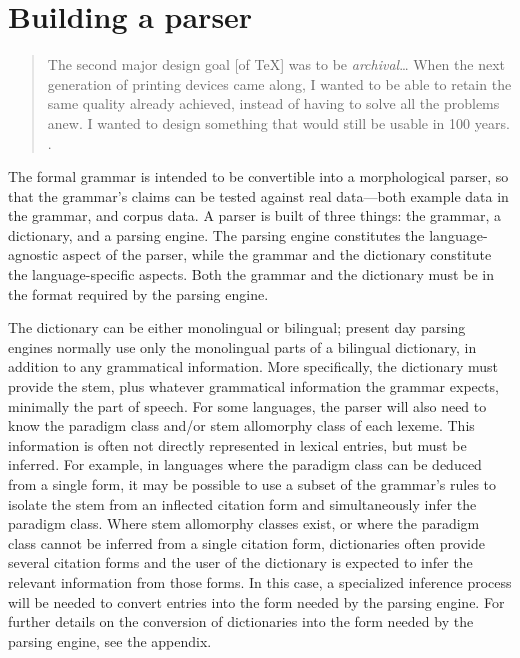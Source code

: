 \section{Building a parser}
\label{bkm:RefHeading64467100141}
\begin{quote}
 The second major design goal [of TeX] was to be {\textit{archival}}{\dots} When the next generation of printing devices came along, I wanted to be able to retain the same quality already achieved, instead of having to solve all the problems anew. I wanted to design
 something that would still be usable in 100 years. \citep[559]{Knuth1986}.
\end{quote}

The formal grammar is intended to be convertible into a morphological parser, so that the grammar's claims can be tested against real data---both example data in the grammar, and corpus data. A parser is built of three things: the grammar, a dictionary, and a parsing engine. The parsing engine constitutes the language-agnostic aspect of the parser, while the grammar and the dictionary constitute the language-specific aspects. Both the grammar and the dictionary must be in the format required by the parsing engine.

The dictionary can be either monolingual or bilingual; present day parsing engines normally use only the monolingual parts of a bilingual dictionary, in addition to any grammatical information. More specifically, the dictionary must provide the stem, plus whatever grammatical information the grammar expects, minimally the part of speech. For some languages, the parser will also need to know the paradigm class and/or stem allomorphy class of each lexeme. This information is often not directly represented in lexical entries, but must be inferred. For example, in languages where the paradigm class can be deduced from a single form, it may be possible to use a subset of the grammar's rules to isolate the stem from an inflected citation form and simultaneously infer the paradigm class. Where stem allomorphy classes exist, or where the paradigm class cannot be inferred from a single citation form, dictionaries often provide several citation forms and the user of the dictionary is expected to infer the relevant information from those forms. In this case, a specialized inference process will be needed to convert entries into the form needed by the parsing engine. For further details on the conversion of dictionaries into the form needed by the parsing engine, see the appendix.


